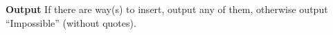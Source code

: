 \textbf{\textbf{Output }}
If there are way(s) to insert, output any of them, otherwise output “Impossible” (without quotes).